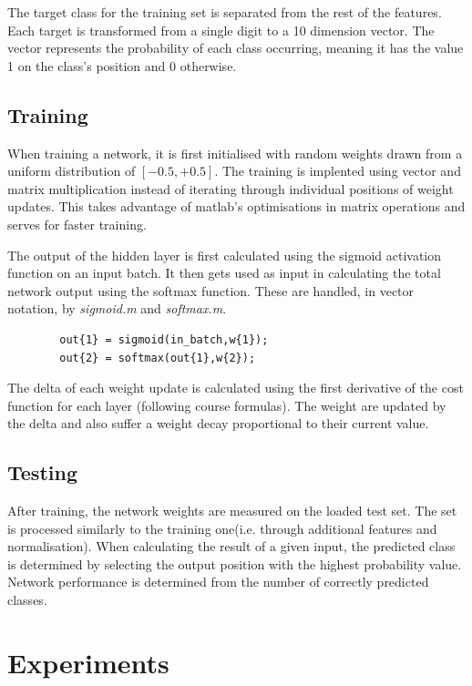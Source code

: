 \documentclass[11]{article}
\begin{document}
The target class for the training set is separated from the rest of the features. Each target is transformed from a single digit to a 10 dimension vector. The vector represents the probability of each class occurring, meaning it has the value 1 on the class's position and 0 otherwise. 

\subsection{Training}

When training a network, it is first initialised with random weights drawn from a uniform distribution of $[-0.5,+0.5]$. The training is implented using vector and matrix multiplication instead of iterating through individual positions of weight updates. This takes advantage of matlab's optimisations in matrix operations and serves for faster training. 

The output of the hidden layer is first calculated using the sigmoid activation function on an input batch. It then gets used as input in calculating the total network output using the softmax function. These are handled, in vector notation, by \emph{sigmoid.m} and \emph{softmax.m}.
\begin{lstlisting}
        out{1} = sigmoid(in_batch,w{1});
        out{2} = softmax(out{1},w{2});
\end{lstlisting}

The delta of each weight update is calculated using the first derivative of the cost function for each layer (following course formulas). The weight are updated by the delta and also suffer a weight decay proportional to their current value. 

\subsection{Testing}

After training, the network weights are measured on the loaded test set. The set is processed similarly to the training one(i.e. through additional features and normalisation). When calculating the result of a given input, the predicted class is determined by selecting the output position with the highest probability value. Network performance is determined from the number of correctly predicted classes. 

\section{Experiments}
\end{document}

